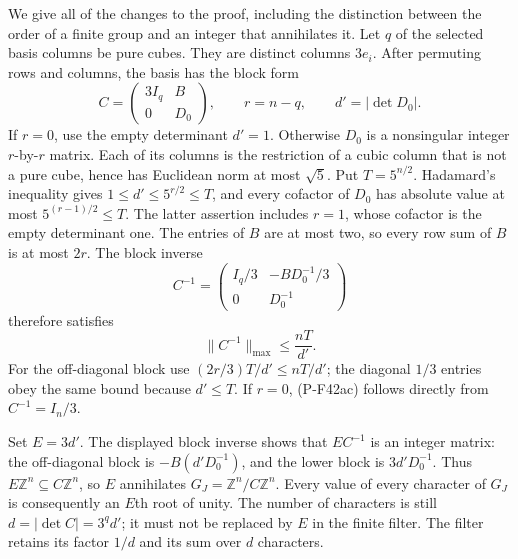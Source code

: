 We give all of the changes to the proof, including the distinction
between the order of a finite group and an integer that annihilates
it. Let \(q\) of the selected basis columns be pure cubes.
They are distinct columns \(3e_i\). After permuting rows and
columns, the basis has the block form
\[
 C=\begin{pmatrix}3I_q&B\\0&D_0\end{pmatrix},
 \qquad r=n-q,\qquad d'=|\det D_0|.
 \tag{P-F42ab}
\]
If \(r=0\), use the empty determinant \(d'=1\).
Otherwise \(D_0\) is a nonsingular integer \(r\)-by-\(r\)
matrix. Each of its columns is the restriction of a cubic
column that is not a pure cube, hence has Euclidean norm
at most \(\sqrt5\). Put \(T=5^{n/2}\).
Hadamard's inequality gives \(1\le d'\le5^{r/2}\le T\),
and every cofactor of \(D_0\) has absolute value at most
\(5^{(r-1)/2}\le T\). The latter assertion includes \(r=1\),
whose cofactor is the empty determinant one.
The entries of \(B\) are at most two, so every row sum of
\(B\) is at most \(2r\).
The block inverse
\[
 C^{-1}=
 \begin{pmatrix}
  I_q/3&-BD_0^{-1}/3\\
  0&D_0^{-1}
 \end{pmatrix}
\]
therefore satisfies
\[
       \|C^{-1}\|_{\max}\le \frac{nT}{d'}.
 \tag{P-F42ac}
\]
For the off-diagonal block use
\((2r/3)T/d'\le nT/d'\);
the diagonal \(1/3\) entries obey the same bound because
\(d'\le T\). If \(r=0\), (P-F42ac) follows directly from
\(C^{-1}=I_n/3\).

Set \(E=3d'\). The displayed block inverse shows that
\(EC^{-1}\) is an integer matrix: the off-diagonal block
is \(-B(d'D_0^{-1})\), and the lower block is
\(3d'D_0^{-1}\). Thus \(E\mathbb Z^n\subseteq C\mathbb Z^n\),
so \(E\) annihilates \(G_J=\mathbb Z^n/C\mathbb Z^n\).
Every value of every character of \(G_J\) is consequently
an \(E\)th root of unity.
The number of characters is still
\(d=|\det C|=3^q d'\); it must not be replaced by \(E\)
in the finite filter. The filter retains its factor \(1/d\)
and its sum over \(d\) characters.

